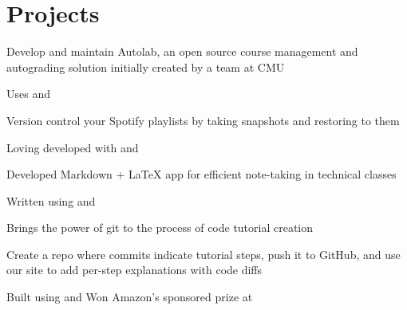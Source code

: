\documentclass[]{deedy-resume-openfont}
\begin{document}
\begin{minipage}[t]{0.66\textwidth}

\section{Projects}
\descript{}
\begin{tightemize}
\item Develop and maintain Autolab, an open source course management and
  autograding solution initially created by a team at CMU
\item Uses  and 
\end{tightemize}
\sectionsep

\descript{}
\begin{tightemize}
\item Version control your Spotify playlists by taking snapshots and restoring
  to them
\item Loving developed with  and 
\end{tightemize}
\sectionsep

\descript{}
\begin{tightemize}
\item Developed Markdown + \LaTeX{} app for efficient note-taking in technical
  classes
\item Written using  and 
\end{tightemize}
\sectionsep

\descript{}
\begin{tightemize}
\item Brings the power of git to the process of code tutorial creation
\item Create a repo where commits indicate tutorial steps, push it to GitHub,
  and use our site to add per-step explanations with code diffs
\item Built using  and  Won Amazon's
  sponsored prize at 
\end{tightemize}
\sectionsep


\end{minipage}
\end{document}
